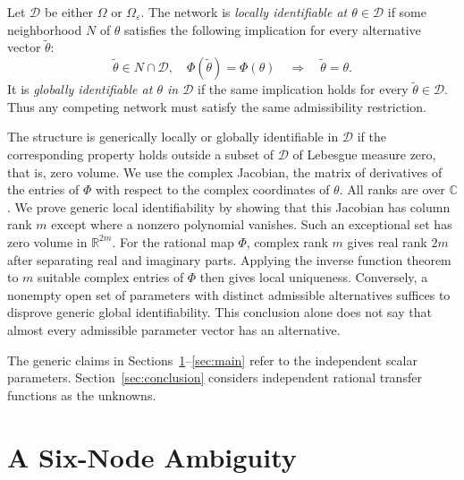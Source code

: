 \documentclass[letterpaper,10pt,conference]{ieeeconf}
\begin{document}
Let \(\mathcal D\) be either \(\Omega\) or \(\Omega_\varepsilon\).
The network is \emph{locally identifiable at \(\theta\in\mathcal D\)}
if some neighborhood \(N\) of \(\theta\) satisfies the following
implication for every alternative vector \(\widetilde\theta\):
\[
 \widetilde\theta\in N\cap\mathcal D,\quad
 \Phi(\widetilde\theta)=\Phi(\theta)
 \quad\Longrightarrow\quad \widetilde\theta=\theta.
\]
It is \emph{globally identifiable at \(\theta\) in \(\mathcal D\)}
if the same implication holds for every
\(\widetilde\theta\in\mathcal D\). Thus any competing network must satisfy
the same admissibility restriction.

The structure is generically locally or globally identifiable in
\(\mathcal D\) if the corresponding property holds outside a subset of
\(\mathcal D\) of Lebesgue measure zero, that is, zero volume.
We use the complex Jacobian, the matrix of derivatives of the entries
of \(\Phi\) with respect to the complex coordinates of \(\theta\).
All ranks are over \(\mathbb C\).
We prove generic local identifiability by showing that this Jacobian
has column rank \(m\) except where a nonzero polynomial vanishes.
Such an exceptional set has zero volume in \(\mathbb R^{2m}\).
For the rational map \(\Phi\), complex rank \(m\) gives real rank \(2m\)
after separating real and imaginary parts. Applying the inverse function
theorem to \(m\) suitable complex entries of \(\Phi\) then gives local
uniqueness. Conversely, a nonempty open
set of parameters with distinct admissible alternatives suffices to
disprove generic global identifiability.
This conclusion alone does not say that almost every admissible
parameter vector has an alternative.

The generic claims in Sections~\ref{sec:base}--\ref{sec:main} refer to
the independent scalar parameters. Section~\ref{sec:conclusion}
considers independent rational transfer functions as the unknowns.

\section{A Six-Node Ambiguity}
\label{sec:base}
\end{document}
